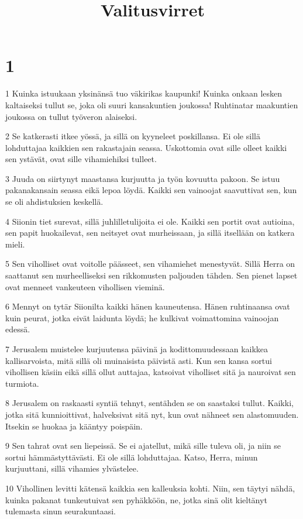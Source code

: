 

\title{Valitusvirret}


\chapter{1}

\par 1 Kuinka istuukaan yksinänsä tuo väkirikas kaupunki! Kuinka onkaan lesken kaltaiseksi tullut se, joka oli suuri kansakuntien joukossa! Ruhtinatar maakuntien joukossa on tullut työveron alaiseksi.
\par 2 Se katkerasti itkee yössä, ja sillä on kyyneleet poskillansa. Ei ole sillä lohduttajaa kaikkien sen rakastajain seassa. Uskottomia ovat sille olleet kaikki sen ystävät, ovat sille vihamiehiksi tulleet.
\par 3 Juuda on siirtynyt maastansa kurjuutta ja työn kovuutta pakoon. Se istuu pakanakansain seassa eikä lepoa löydä. Kaikki sen vainoojat saavuttivat sen, kun se oli ahdistuksien keskellä.
\par 4 Siionin tiet surevat, sillä juhlilletulijoita ei ole. Kaikki sen portit ovat autioina, sen papit huokailevat, sen neitsyet ovat murheissaan, ja sillä itsellään on katkera mieli.
\par 5 Sen viholliset ovat voitolle päässeet, sen vihamiehet menestyvät. Sillä Herra on saattanut sen murheelliseksi sen rikkomusten paljouden tähden. Sen pienet lapset ovat menneet vankeuteen vihollisen vieminä.
\par 6 Mennyt on tytär Siionilta kaikki hänen kauneutensa. Hänen ruhtinaansa ovat kuin peurat, jotka eivät laidunta löydä; he kulkivat voimattomina vainoojan edessä.
\par 7 Jerusalem muistelee kurjuutensa päivinä ja kodittomuudessaan kaikkea kallisarvoista, mitä sillä oli muinaisista päivistä asti. Kun sen kansa sortui vihollisen käsiin eikä sillä ollut auttajaa, katsoivat viholliset sitä ja nauroivat sen turmiota.
\par 8 Jerusalem on raskaasti syntiä tehnyt, sentähden se on saastaksi tullut. Kaikki, jotka sitä kunnioittivat, halveksivat sitä nyt, kun ovat nähneet sen alastomuuden. Itsekin se huokaa ja kääntyy poispäin.
\par 9 Sen tahrat ovat sen liepeissä. Se ei ajatellut, mikä sille tuleva oli, ja niin se sortui hämmästyttävästi. Ei ole sillä lohduttajaa. Katso, Herra, minun kurjuuttani, sillä vihamies ylvästelee.
\par 10 Vihollinen levitti kätensä kaikkia sen kalleuksia kohti. Niin, sen täytyi nähdä, kuinka pakanat tunkeutuivat sen pyhäkköön, ne, jotka sinä olit kieltänyt tulemasta sinun seurakuntaasi.
